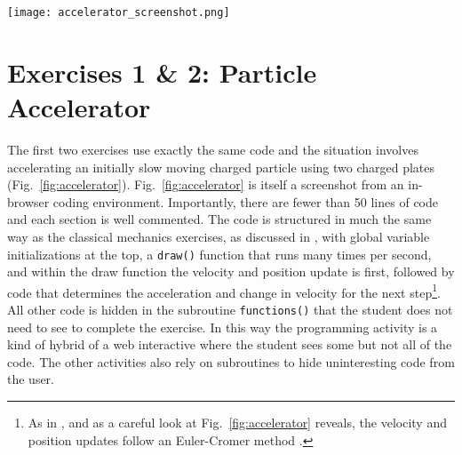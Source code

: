 \documentclass[aps,prd,10pt,twocolumn,showpacs,preprintnumbers,amsmath,amssymb,nofootinbib,floatfix]{revtex4-1}
\begin{document}
\begin{figure*}
\texttt{[image: accelerator\_screenshot.png]}
\caption{A screenshot of the Particle Accelerator programming activity from the in-browser interface. The visualization on the right shows the particle being accelerated from between two charged plates. The particle enters from the left traveling slowly and exits to the right.} \label{fig:accelerator}
\end{figure*}

\section{Exercises 1 \& 2: Particle Accelerator}

The first two exercises use exactly the same code and the situation involves accelerating an initially slow moving charged particle using two charged plates (Fig.~\ref{fig:accelerator}). Fig.~\ref{fig:accelerator} is itself a screenshot from an in-browser coding environment. Importantly, there are fewer than 50 lines of code and each section is well commented. The code is structured in much the same way as the classical mechanics exercises, as discussed in \cite{Orban_etal2017}, with global variable initializations at the top, a \texttt{draw()} function that runs many times per second, and within the draw function the velocity and position update is first, followed by code that determines the acceleration and change in velocity for the next step\footnote{As in \cite{Orban_etal2017}, and as a careful look at Fig.~\ref{fig:accelerator} reveals, the velocity and position updates follow an Euler-Cromer method \cite{Cromer1981}.}. All other code is hidden in the subroutine \texttt{functions()} that the student does not need to see to complete the exercise. In this way the programming activity is a kind of hybrid of a web interactive where the student sees some but not all of the code. The other activities also rely on subroutines to hide uninteresting code from the user.
\end{document}
